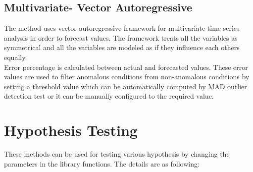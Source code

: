 \subsection{Multivariate- Vector Autoregressive}
The method uses vector autoregressive framework for multivariate time-series analysis in order to forecast values. The framework treats all the variables as symmetrical and all the variables are modeled as if they influence each others equally.
\\
Error percentage is calculated between actual and forecasted values. These error values are used to filter anomalous conditions from non-anomalous conditions by setting a threshold value which can be automatically computed by MAD outlier detection test or it can be manually configured to the required value.
\section{Hypothesis Testing}
These methods can be used for testing various hypothesis by changing the parameters in the library functions. The details are as following:
